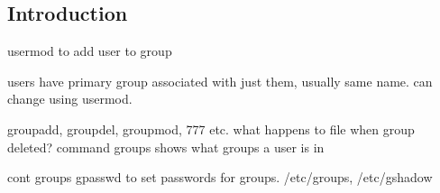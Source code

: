
\subsection{Introduction}

usermod to add user to group

users have primary group associated with just them, usually same name.
can change using usermod.

groupadd, groupdel, groupmod, 777 etc. what happens to file when group deleted? command groups shows what groups a user is in



cont groups gpasswd to set passwords for groups. /etc/groups, /etc/gshadow

